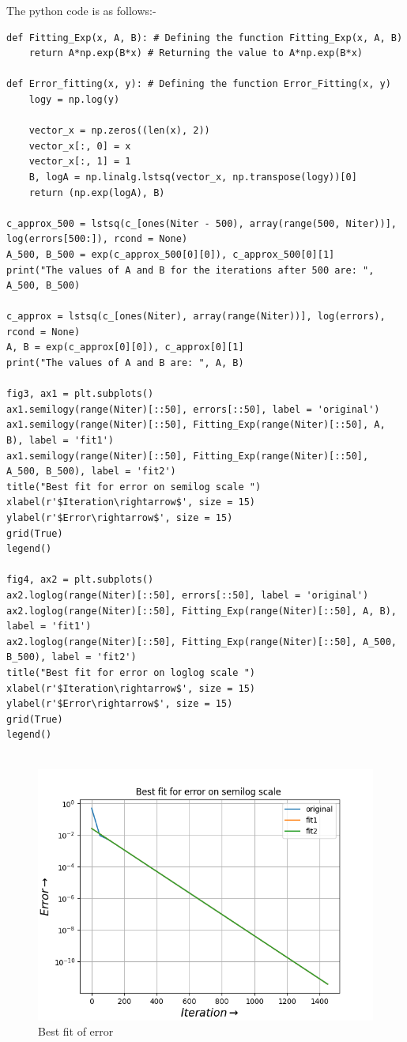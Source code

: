 \documentclass[11pt, a4paper]{article}
\begin{document}
The python code is as follows:-
\begin{verbatim}
def Fitting_Exp(x, A, B): # Defining the function Fitting_Exp(x, A, B)
    return A*np.exp(B*x) # Returning the value to A*np.exp(B*x) 
    
def Error_fitting(x, y): # Defining the function Error_Fitting(x, y) 
    logy = np.log(y)

    vector_x = np.zeros((len(x), 2))
    vector_x[:, 0] = x
    vector_x[:, 1] = 1
    B, logA = np.linalg.lstsq(vector_x, np.transpose(logy))[0]
    return (np.exp(logA), B)
    
c_approx_500 = lstsq(c_[ones(Niter - 500), array(range(500, Niter))], 
log(errors[500:]), rcond = None) 
A_500, B_500 = exp(c_approx_500[0][0]), c_approx_500[0][1]
print("The values of A and B for the iterations after 500 are: ", A_500, B_500)

c_approx = lstsq(c_[ones(Niter), array(range(Niter))], log(errors), rcond = None) 
A, B = exp(c_approx[0][0]), c_approx[0][1]
print("The values of A and B are: ", A, B)
    
fig3, ax1 = plt.subplots()
ax1.semilogy(range(Niter)[::50], errors[::50], label = 'original')
ax1.semilogy(range(Niter)[::50], Fitting_Exp(range(Niter)[::50], A, B), label = 'fit1')
ax1.semilogy(range(Niter)[::50], Fitting_Exp(range(Niter)[::50], A_500, B_500), label = 'fit2')
title("Best fit for error on semilog scale ")
xlabel(r'$Iteration\rightarrow$', size = 15)
ylabel(r'$Error\rightarrow$', size = 15)
grid(True)
legend()

fig4, ax2 = plt.subplots()
ax2.loglog(range(Niter)[::50], errors[::50], label = 'original')
ax2.loglog(range(Niter)[::50], Fitting_Exp(range(Niter)[::50], A, B), label = 'fit1')
ax2.loglog(range(Niter)[::50], Fitting_Exp(range(Niter)[::50], A_500, B_500), label = 'fit2')
title("Best fit for error on loglog scale ")
xlabel(r'$Iteration\rightarrow$', size = 15)
ylabel(r'$Error\rightarrow$', size = 15)
grid(True)
legend()


\end{verbatim} 


\begin{figure}[!tbh]
 \centering
 \includegraphics[scale=0.7]{Ass5_Figure_5.png}  
 \caption{Best fit of error}
\end{figure}
\end{document}
